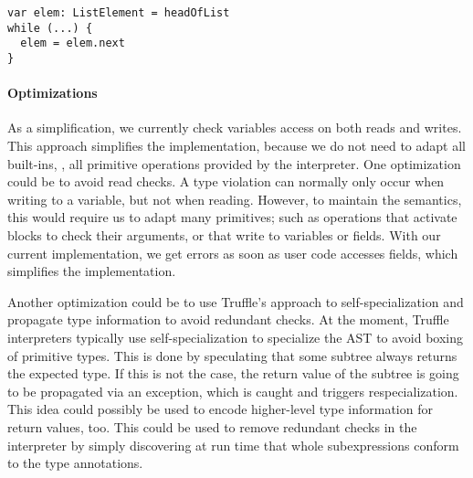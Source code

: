 \begin{lstlisting}[caption={Example for dynamic type checks not corresponding to existing checks.},escapechar=|,label={ex:pathological-case},float,floatplacement=htb]
var elem: ListElement = headOfList
while (...) {
  elem = elem.next
}
\end{lstlisting}

\paragraph{Optimizations}


As a simplification, we currently check variables access
on both reads and writes.
This approach simplifies the implementation, because we do not need to
adapt all built-ins, \ie,
all primitive operations provided by the interpreter.
One optimization could be to avoid read checks.
A type violation can normally only occur when writing to a variable,
but not when reading.
However, to maintain the semantics, this would require us to adapt
many primitives; 
such as operations that activate blocks to check their arguments,
or that write to variables or fields.
With our current implementation,
we get errors as soon as user code accesses fields,
which simplifies the implementation.


Another optimization could be to use Truffle's approach to 
self-specialization\citep{Wurthinger:2012:SelfOptAST}
and propagate type information to avoid redundant checks.
At the moment, Truffle interpreters typically use self-specialization to 
specialize the AST to avoid boxing of primitive types.
This is done by speculating that some subtree always returns the expected type.
If this is not the case, the return value of the subtree is going to be
propagated via an exception, which is caught and triggers respecialization.
This idea could possibly be used to encode higher-level type information for
return values, too.
This could be used to remove redundant checks in the interpreter
by simply discovering at run time that whole subexpressions conform to the
type annotations.
